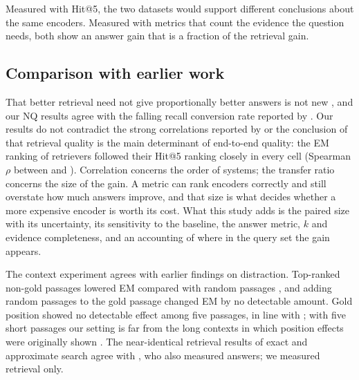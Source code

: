 Measured with Hit@5, the two datasets would support different conclusions about the same encoders. Measured with metrics that count the evidence the question needs, both show an answer gain that is a fraction of the retrieval gain.

\subsection{Comparison with earlier work}
That better retrieval need not give proportionally better answers is not new \citep{salemi2024erag,mathur2026policy,ghosh2026evidence}, and our NQ results agree with the falling recall conversion rate reported by \citet{peng2026neocorrag}. Our results do not contradict the strong correlations reported by \citet{samuel2026beyond} or the conclusion of \citet{hitl2026comparative} that retrieval quality is the main determinant of end-to-end quality: the EM ranking of retrievers followed their Hit@5 ranking closely in every cell (Spearman $\rho$ between  and ). Correlation concerns the order of systems; the transfer ratio concerns the size of the gain. A metric can rank encoders correctly and still overstate how much answers improve, and that size is what decides whether a more expensive encoder is worth its cost. What this study adds is the paired size with its uncertainty, its sensitivity to the baseline, the answer metric, $k$ and evidence completeness, and an accounting of where in the query set the gain appears.

The context experiment agrees with earlier findings on distraction. Top-ranked non-gold passages lowered EM compared with random passages \citep{cuconasu2024power,amiraz2025distracting,repantis2026competition}, and adding random passages to the gold passage changed EM by no detectable amount. Gold position showed no detectable effect among five passages, in line with \citet{cuconasu2025positional}; with five short passages our setting is far from the long contexts in which position effects were originally shown \citep{liu2024lost}. The near-identical retrieval results of exact and approximate search agree with \citet{leto2024toward}, who also measured answers; we measured retrieval only.

